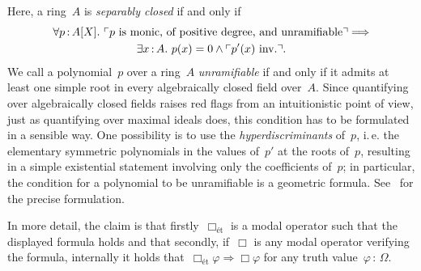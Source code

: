 \documentclass[10pt,reqno,a4paper]{amsbook}
\makeatletter
\theoremstyle{definition}
\theoremstyle{plain}
\theoremstyle{remark}
\newcommand{\?}{\,{:}\,}
\renewcommand{\_}{\mathpunct{.}\,}
\newcommand{\speak}[1]{\ulcorner\text{\textnormal{#1}}\urcorner}
\newcommand{\ie}{i.\,e.\@\xspace}
\newcommand{\inv}{inv.\@}
\makeatother
\begin{document}
Here, a ring~$A$ is \emph{separably closed} if and only if
\begin{multline*}
  \forall p\?A[X]\_ \speak{$p$ is monic, of positive degree, and unramifiable}
  \Longrightarrow \\
  \exists x\?A\_ p(x) = 0 \wedge \speak{$p'(x)$ \inv}.
\end{multline*}
We call a polynomial~$p$ over a ring~$A$ \emph{unramifiable} if and
only if it admits at least one simple root in every algebraically closed field
over~$A$. Since quantifying over algebraically closed fields raises red flags
from an intuitionistic point of view, just as quantifying over maximal ideals
does, this condition has to be formulated in a sensible way. One possibility is
to use the \emph{hyperdiscriminants} of~$p$, \ie the elementary symmetric
polynomials in the values of~$p'$ at the roots of~$p$, resulting in a simple
existential statement involving only the coefficients of~$p$; in particular,
the condition for a polynomial to be unramifiable is a geometric formula.
See~\cite[p.~751]{wraith:generic-galois-theory} for the precise formulation.

In more detail, the claim is that firstly~$\Box_\text{ét}$ is a modal operator
such that the displayed formula holds and that secondly, if~$\Box$ is any modal
operator verifying the formula, internally it holds that~$\Box_\text{ét}\varphi
\Rightarrow \Box\varphi$ for any truth value~$\varphi\?\Omega$.
\end{document}
